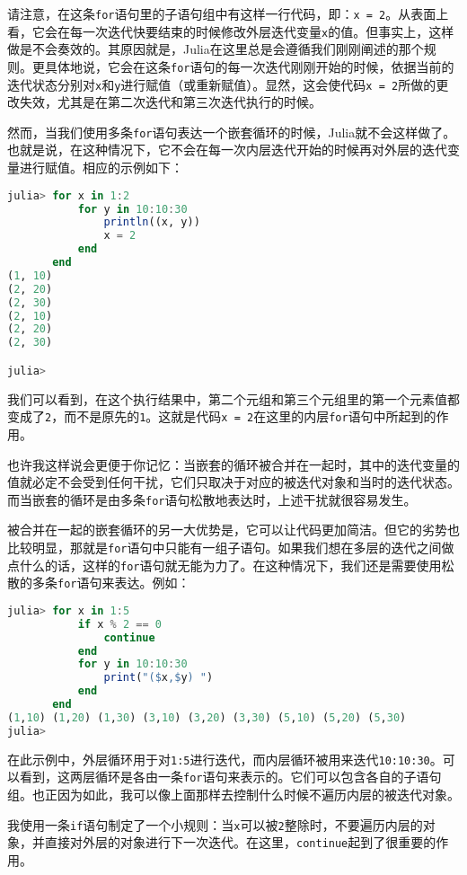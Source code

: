 请注意，在这条\verb`for`语句里的子语句组中有这样一行代码，即：\verb`x = 2`。从表面上看，它会在每一次迭代快要结束的时候修改外层迭代变量\verb`x`的值。但事实上，这样做是不会奏效的。其原因就是，Julia在这里总是会遵循我们刚刚阐述的那个规则。更具体地说，它会在这条\verb`for`语句的每一次迭代刚刚开始的时候，依据当前的迭代状态分别对\verb`x`和\verb`y`进行赋值（或重新赋值）。显然，这会使代码\verb`x = 2`所做的更改失效，尤其是在第二次迭代和第三次迭代执行的时候。

然而，当我们使用多条\verb`for`语句表达一个嵌套循环的时候，Julia就不会这样做了。也就是说，在这种情况下，它不会在每一次内层迭代开始的时候再对外层的迭代变量进行赋值。相应的示例如下：
\begin{lstlisting}[language=julia]
julia> for x in 1:2
           for y in 10:10:30
               println((x, y))
               x = 2
           end
       end
(1, 10)
(2, 20)
(2, 30)
(2, 10)
(2, 20)
(2, 30)

julia> 
\end{lstlisting}

我们可以看到，在这个执行结果中，第二个元组和第三个元组里的第一个元素值都变成了\verb`2`，而不是原先的\verb`1`。这就是代码\verb`x = 2`在这里的内层\verb`for`语句中所起到的作用。

也许我这样说会更便于你记忆：当嵌套的循环被合并在一起时，其中的迭代变量的值就必定不会受到任何干扰，它们只取决于对应的被迭代对象和当时的迭代状态。而当嵌套的循环是由多条\verb`for`语句松散地表达时，上述干扰就很容易发生。

被合并在一起的嵌套循环的另一大优势是，它可以让代码更加简洁。但它的劣势也比较明显，那就是\verb`for`语句中只能有一组子语句。如果我们想在多层的迭代之间做点什么的话，这样的\verb`for`语句就无能为力了。在这种情况下，我们还是需要使用松散的多条\verb`for`语句来表达。例如：
\begin{lstlisting}[language=julia]
julia> for x in 1:5
           if x % 2 == 0
               continue
           end
           for y in 10:10:30
               print("($x,$y) ")
           end
       end
(1,10) (1,20) (1,30) (3,10) (3,20) (3,30) (5,10) (5,20) (5,30) 
julia> 
\end{lstlisting}

在此示例中，外层循环用于对\verb`1:5`进行迭代，而内层循环被用来迭代\verb`10:10:30`。可以看到，这两层循环是各由一条\verb`for`语句来表示的。它们可以包含各自的子语句组。也正因为如此，我可以像上面那样去控制什么时候不遍历内层的被迭代对象。

我使用一条\verb`if`语句制定了一个小规则：当\verb`x`可以被\verb`2`整除时，不要遍历内层的对象，并直接对外层的对象进行下一次迭代。在这里，\verb`continue`起到了很重要的作用。

